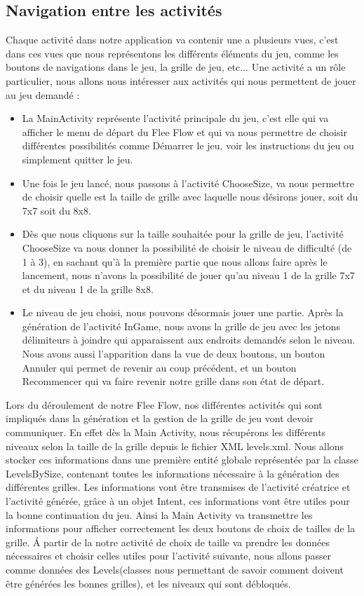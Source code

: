 \documentclass[12pt, a4paper]{article}%
\begin{document}
  \subsection{Navigation entre les activités}
  	Chaque activité dans notre application va contenir une a plusieurs vues, c'est dans ces vues que nous représentons les différents éléments du jeu, comme les boutons de navigations dans le jeu, la grille de jeu, etc... Une activité a un rôle particulier, nous allons nous intéresser aux activités qui nous permettent de jouer au jeu demandé :
  	\begin{itemize}
  	\item La MainActivity représente l'activité principale du jeu, c'est elle qui va afficher le menu de départ du Flee Flow et qui va nous permettre de choisir différentes possibilités comme Démarrer le jeu, voir les instructions du jeu ou simplement quitter le jeu.
  	\item Une fois le jeu lancé, nous passons à l'activité ChooseSize, va nous permettre de choisir quelle est la taille de grille avec laquelle nous désirons jouer, soit du 7x7 soit du 8x8.
  	\item Dès que nous cliquons sur la taille souhaitée pour la grille de jeu, l'activité ChooseSize va nous donner la possibilité de choisir le niveau de difficulté (de 1 à 3), en sachant qu'à la première partie que nous allons faire après le lancement, nous n'avons la possibilité de jouer qu'au niveau 1 de la grille 7x7 et du niveau 1 de la grille 8x8.
  	\item Le niveau de jeu choisi, nous pouvons désormais jouer une partie. Après la génération de l'activité InGame, nous avons la grille de jeu avec les jetons délimiteurs à joindre qui apparaissent aux endroits demandés selon le niveau. Nous avons aussi l'apparition dans la vue de deux boutons, un bouton Annuler qui permet de revenir au coup précédent, et un bouton Recommencer qui va faire revenir notre grille dans son état de départ.
  	\end{itemize}
Lors du déroulement de notre Flee Flow, nos différentes activités qui sont impliqués dans la génération et la gestion de la grille de jeu vont devoir communiquer. En effet dès la Main Activity, nous récupérons les différents niveaux selon la taille de la grille depuis le fichier XML levels.xml. Nous allons stocker ces informations dans une première entité globale représentée par la classe LevelsBySize, contenant toutes les informations nécessaire à la génération des différentes grilles. Les informations vont être transmises de l'activité créatrice et l'activité générée, grâce à un objet Intent, ces informations vont être utiles pour la bonne continuation du jeu. Ainsi la Main Activity va transmettre les informations pour afficher correctement les deux boutons de choix de tailles de la grille. \'A partir de la notre activité de choix de taille va prendre les données nécessaires et choisir celles utiles pour l'activité suivante, nous allons passer comme données des Levels(classes nous permettant de savoir comment doivent être générées les bonnes grilles), et les niveaux qui sont débloqués.
\end{document}
